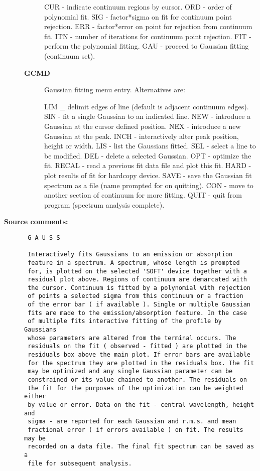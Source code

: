 \begin{description}
\begin{description}
    CUR - indicate continuum regions by cursor.
    ORD - order of polynomial fit.
    SIG - factor*sigma on fit for continuum point rejection.
    ERR - factor*error on point for rejection from continuum fit.
    ITN - number of iterations for continuum point rejection.
    FIT - perform the polynomial fitting.
    GAU - proceed to Gaussian fitting (continuum set).
\item [{\bf GCMD}]
 Gaussian fitting menu entry. Alternatives are:

    LIM   _ delimit edges of line (default is adjacent
            continuum edges).
    SIN   - fit a single Gaussian to an indicated line.
    NEW   - introduce a Gaussian at the cursor defined
            position.
    NEX   - introduce a new Gaussian at the peak.
    INCH  - interactively alter peak position, height or
            width.
    LIS   - list the Gaussians fitted.
    SEL   - select a line to be modified.
    DEL   - delete a selected Gaussian.
    OPT   - optimize the fit.
    RECAL - read a previous fit data file and plot this fit.
    HARD  - plot results of fit for hardcopy device.
    SAVE  - save the Gaussian fit spectrum as a file (name
            prompted for on quitting).
    CON   - move to another section of continuum for more
            fitting.
    QUIT  - quit from program (spectrum analysis complete).
\end{description}

\item [{\bf Source comments:}]
\begin{verbatim}
 G A U S S

 Interactively fits Gaussians to an emission or absorption
 feature in a spectrum. A spectrum, whose length is prompted
 for, is plotted on the selected 'SOFT' device together with a
 residual plot above. Regions of continuum are demarcated with
 the cursor. Continuum is fitted by a polynomial with rejection
 of points a selected sigma from this continuum or a fraction
 of the error bar ( if available ). Single or multiple Gaussian
 fits are made to the emission/absorption feature. In the case
 of multiple fits interactive fitting of the profile by Gaussians
 whose parameters are altered from the terminal occurs. The
 residuals on the fit ( observed - fitted ) are plotted in the
 residuals box above the main plot. If error bars are available
 for the spectrum they are plotted in the residuals box. The fit
 may be optimized and any single Gaussian parameter can be
 constrained or its value chained to another. The residuals on
 the fit for the purposes of the optimization can be weighted either
 by value or error. Data on the fit - central wavelength, height and
 sigma - are reported for each Gaussian and r.m.s. and mean
 fractional error ( if errors available ) on fit. The results may be
 recorded on a data file. The final fit spectrum can be saved as a
 file for subsequent analysis.


\end{verbatim}
\end{description}
